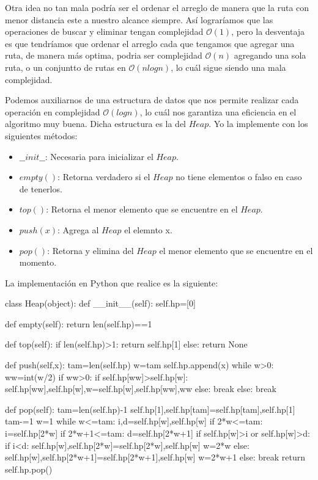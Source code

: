 \documentclass[12pt,a4paper]{article}
\begin{document}
Otra idea no tan mala podr\'ia ser el ordenar el arreglo de manera que la ruta con menor distancia este a nuestro alcance siempre. As\'i lograr\'iamos que las operaciones de buscar y eliminar tengan complejidad $\mathcal{O}(1)$, pero la desventaja es que tendr\'iamos que ordenar el arreglo cada que tengamos que agregar una ruta, de manera m\'as optima, podria ser complejidad $\mathcal{O}(n)$ agregando una sola ruta, o un conjuntto de rutas en $\mathcal{O}(nlog{}n)$, lo cu\'al sigue siendo una mala complejidad.

Podemos auxiliarnos de una estructura de datos que nos permite realizar cada operaci\'on en complejidad $\mathcal{O}(log{}n)$, lo cu\'al nos garantiza una eficiencia en el algoritmo muy buena. Dicha estructura es la del $Heap$. Yo la implemente con los siguientes m\'etodos:
\begin{itemize}
	\item $\_\_init\_\_$: Necesaria para inicializar el $Heap$.
	\item $empty()$: Retorna verdadero si el $Heap$ no tiene elementos o falso en caso de tenerlos.
	\item $top()$: Retorna el menor elemento que se encuentre en el $Heap$.
	\item $push(x)$: Agrega al $Heap$ el elemnto x.
	\item $pop()$: Retorna y elimina del $Heap$ el menor elemento que se encuentre en el momento. 
\end{itemize}

La implementaci\'on en Python que realice es la siguiente:

\begin{python}
class Heap(object):
    def __init__(self):
        self.hp=[0]

    def empty(self):
        return len(self.hp)==1

    def top(self):
        if len(self.hp)>1:
            return self.hp[1]
        else:
            return None

    def push(self,x):
        tam=len(self.hp)
        w=tam
        self.hp.append(x)
        while w>0:
            ww=int(w/2)
            if ww>0:
                if self.hp[ww]>self.hp[w]:
                    self.hp[ww],self.hp[w],w=self.hp[w],self.hp[ww],ww
                else:
                    break
            else:
                break

    def pop(self):
        tam=len(self.hp)-1
        self.hp[1],self.hp[tam]=self.hp[tam],self.hp[1]
        tam-=1
        w=1
        while w<=tam:
            i,d=self.hp[w],self.hp[w]
            if 2*w<=tam:
                i=self.hp[2*w]
            if 2*w+1<=tam:
                d=self.hp[2*w+1]
            if self.hp[w]>i or self.hp[w]>d:
                if i<d:
                    self.hp[w],self.hp[2*w]=self.hp[2*w],self.hp[w]
                    w=2*w
                else:
                    self.hp[w],self.hp[2*w+1]=self.hp[2*w+1],self.hp[w]
                    w=2*w+1
            else:
                break
        return self.hp.pop()
        
\end{python}
\end{document}
